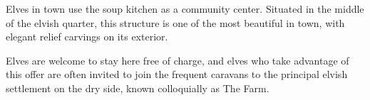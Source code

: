 Elves in town use the soup kitchen as a community center.
Situated in the middle of the elvish quarter, this structure is one of the most beautiful in town, with elegant relief carvings on its exterior.

Elves are welcome to stay here free of charge, and elves who take advantage of this offer are often invited to join the frequent caravans to the principal elvish settlement on the dry side, known colloquially as The Farm.
